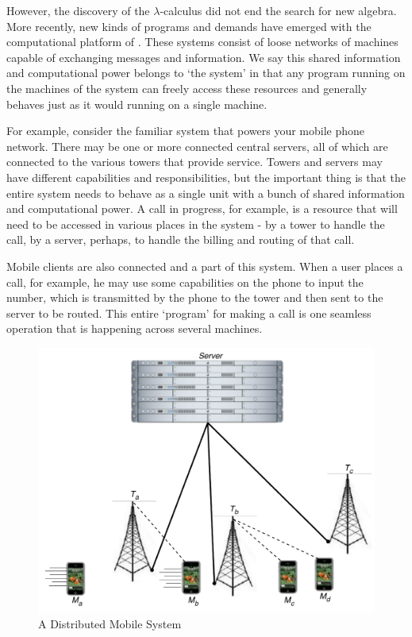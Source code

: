 However, the discovery of the $\lambda$-calculus did not end the search for new algebra.  
More recently, new kinds of programs and demands have emerged with the computational platform of .  
These systems consist of loose networks of machines capable of exchanging messages and information.  
We say this shared information and computational power belongs to `the system' in that any program running on the machines of the system can freely access these resources and generally behaves just as it would running on a single machine.

For example, consider the familiar system that powers your mobile phone network.  
There may be one or more connected central servers, all of which are connected to the various towers that provide service.  
Towers and servers may have different capabilities and responsibilities, but the important thing is that the entire system needs to behave as a single unit with a bunch of shared information and computational power.  
A call in progress, for example, is a resource that will need to be accessed in various places in the system - by a tower to handle the call, by a server, perhaps, to handle the billing and routing of that call.  


Mobile clients are also connected and a part of this system.  
When a user places a call, for example, he may use some capabilities on the phone to input the number, which is transmitted by the phone to the tower and then sent to the server to be routed.  
This entire `program' for making a call is one seamless operation that is happening across several machines.  


\begin{figure}[H]
\centering
\includegraphics[scale=0.7]{figures/cell_network.pdf} %
\caption{A Distributed Mobile System}
\label{fig_cell_network}
\end{figure}


